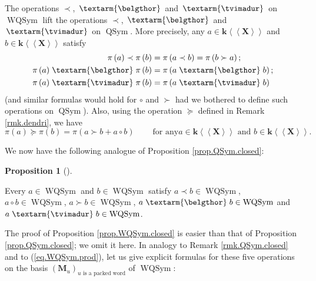 \documentclass[numbers=enddot,12pt,final,onecolumn,notitlepage,abstracton]{scrartcl}%
\theoremstyle{definition}
\newtheorem{prop}[theo]{Proposition}
\newenvironment{proposition}[1][]
{\begin{prop}[#1]\begin{leftbar}}
{\end{leftbar}\end{prop}}
\newcommand{\tvi}{\left. \textarm{\tvimadur} \right.}
\newcommand{\bel}{\left. \textarm{\belgthor} \right.}
\begin{document}
The operations $\left.  \prec\right.  $, $\bel $ and $\tvi $ on
$\operatorname*{WQSym}$ lift the operations $\left.  \prec\right.  $, $\bel $
and $\tvi $ on $\operatorname*{QSym}$. More precisely, any $a\in
\mathbf{k}\left\langle \left\langle \mathbf{X}\right\rangle \right\rangle $
and $b\in\mathbf{k}\left\langle \left\langle \mathbf{X}\right\rangle
\right\rangle $ satisfy%
\begin{align*}
\pi\left(  a\right)  \left.  \prec\right.  \pi\left(  b\right)   &
=\pi\left(  a\left.  \prec\right.  b\right)  =\pi\left(  b\left.
\succ\right.  a\right)  ;\\
\pi\left(  a\right)  \bel \pi\left(  b\right)   &  =\pi\left(  a
\bel b\right)  ;\\
\pi\left(  a\right)  \tvi \pi\left(  b\right)   &  =\pi\left(  a
\tvi b\right)
\end{align*}
(and similar formulas would hold for $\circ$ and $\left.  \succ\right.  $ had
we bothered to define such operations on $\operatorname*{QSym}$). Also, using
the operation $\left.  \succeq\right.  $ defined in Remark \ref{rmk.dendri},
we have%
\[
\pi\left(  a\right)  \left.  \succeq\right.  \pi\left(  b\right)  =\pi\left(
a\left.  \succ\right.  b+a\circ b\right)  \ \ \ \ \ \ \ \ \ \ \text{for any
}a\in\mathbf{k}\left\langle \left\langle \mathbf{X}\right\rangle \right\rangle
\text{ and }b\in\mathbf{k}\left\langle \left\langle \mathbf{X}\right\rangle
\right\rangle .
\]


We now have the following analogue of Proposition \ref{prop.QSym.closed}:

\begin{proposition}
\label{prop.WQSym.closed}Every $a\in\operatorname*{WQSym}$ and $b\in
\operatorname*{WQSym}$ satisfy $a\left.  \prec\right.  b\in
\operatorname*{WQSym}$, $a\circ b\in\operatorname*{WQSym}$, $a\left.
\succ\right.  b\in\operatorname*{WQSym}$, $a \bel b\in\operatorname*{WQSym}$
and $a \tvi b\in\operatorname*{WQSym}$.
\end{proposition}

The proof of Proposition \ref{prop.WQSym.closed} is easier than that of
Proposition \ref{prop.QSym.closed}; we omit it here. In analogy to Remark
\ref{rmk.QSym.closed} and to (\ref{eq.WQSym.prod}), let us give explicit
formulas for these five operations on the basis $\left(  \mathbf{M}%
_{u}\right)  _{u\text{ is a packed word}}$ of $\operatorname*{WQSym}$:
\end{document}
